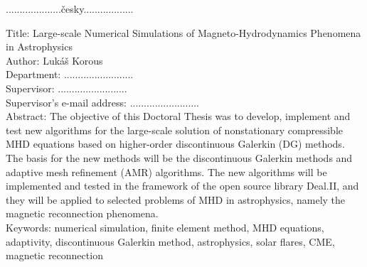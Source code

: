 \normalsize
\setcounter{page}{1}
\tableofcontents

\newpage

\noindent
....................česky..................
\vspace{10mm}

\noindent
Title: Large-scale Numerical Simulations of Magneto-Hydrodynamics Phenomena in Astrophysics\\
Author: Lukáš Korous\\
Department: .........................\\
Supervisor: .........................\\
Supervisor's e-mail address: .........................\\

\noindent Abstract:
The objective of this Doctoral Thesis was to develop, implement and test new algorithms for the large-scale solution of nonstationary compressible MHD equations based on higher-order discontinuous Galerkin (DG) methods. The basis for the new methods will be the discontinuous Galerkin methods and adaptive mesh refinement (AMR) algorithms. The new algorithms will be implemented and tested in the framework of the open source library Deal.II, and they will be applied to selected problems of MHD in astrophysics, namely the magnetic reconnection phenomena. \\

\noindent Keywords: numerical simulation, finite element method, MHD equations, adaptivity, discontinuous Galerkin method, astrophysics, solar flares, CME, magnetic reconnection

\newpage
